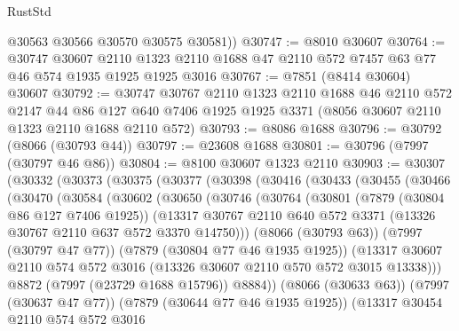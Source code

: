 \begin{lexlean}{RustStd}
\begin{coremodule}
{\begin{coremodule}
{{{{{{{{{{{{{{{{{{{{{{{{{{{{{{{{{{{{{{{{{{{        @30563
        @30566
        @30570
        @30575
        @30581))
@30747 := @8010 @30607
@30764 := @30747
    @30607
    @2110
    @1323
    @2110
    @1688
    @47
    @2110
    @572
    @7457
    @63
    @77
    @46
    @574
    @1935
    @1925
    @1925
    @3016
@30767 := @7851 (@8414 @30604) @30607
@30792 := @30747
    @30767
    @2110
    @1323
    @2110
    @1688
    @46
    @2110
    @572
    @2147
    @44
    @86
    @127
    @640
    @7406
    @1925
    @1925
    @3371
    (@8056 @30607 @2110 @1323 @2110 @1688 @2110 @572)
@30793 := @8086 @1688
@30796 := @30792 (@8066 (@30793 @44))
@30797 := @23608 @1688
@30801 := @30796 (@7997 (@30797 @46 @86))
@30804 := @8100 @30607 @1323 @2110
@30903 := @30307
    (@30332
      (@30373
        (@30375
          (@30377
            (@30398
              (@30416
                (@30433
                  (@30455
                    (@30466
                      (@30470
                        (@30584
                          (@30602
                            (@30650
                              (@30746
                                (@30764
                                  (@30801
                                    (@7879 (@30804 @86 @127 @7406 @1925))
                                    (@13317
                                      @30767
                                      @2110
                                      @640
                                      @572
                                      @3371
                                      (@13326 @30767 @2110 @637 @572 @3370 @14750)))
                                  (@8066 (@30793 @63))
                                  (@7997 (@30797 @47 @77))
                                  (@7879 (@30804 @77 @46 @1935 @1925))
                                  (@13317
                                    @30607
                                    @2110
                                    @574
                                    @572
                                    @3016
                                    (@13326 @30607 @2110 @570 @572 @3015 @13338)))
                                @8872
                                (@7997 (@23729 @1688 @15796))
                                @8884))
                            (@8066 (@30633 @63))
                            (@7997 (@30637 @47 @77))
                            (@7879 (@30644 @77 @46 @1935 @1925))
                            (@13317
                              @30454
                              @2110
                              @574
                              @572
                              @3016
}}}}}}}}}}}}}}}}}}}}}}}}}}}}}}}}}}}}}}}}}}}
\end{coremodule}}
\end{coremodule}
\end{lexlean}
